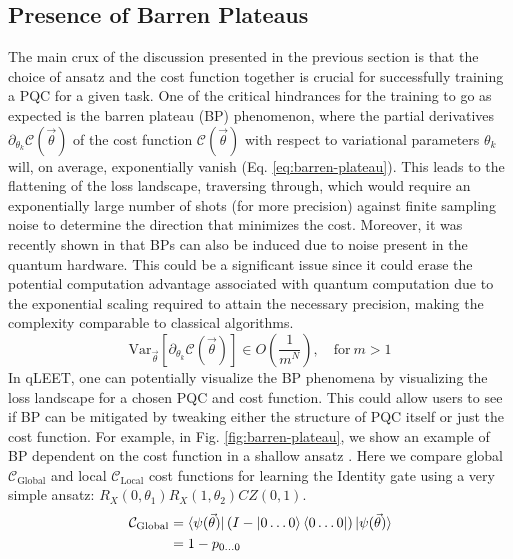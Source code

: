 \documentclass[%
 reprint,
 amsmath,
 amssymb,
 showkeys,
 pra,
 floatfix,
]{revtex4-2}
\begin{document}
\vspace{-2pt}

\subsection{Presence of Barren Plateaus}

The main crux of the discussion presented in the previous section is that the choice of ansatz and the cost function together is crucial for successfully training a PQC for a given task. One of the critical hindrances for the training to go as expected is the barren plateau (BP) phenomenon, where the partial derivatives $\partial_{\theta_k}\mathcal{C}(\vec{\theta})$ of the cost function $\mathcal{C}(\vec{\theta})$ with respect to variational parameters $\theta_k$ will, on average, exponentially vanish (Eq. \ref{eq:barren-plateau}). This leads to the flattening of the loss landscape, traversing through, which would require an exponentially large number of shots (for more precision) against finite sampling noise to determine the direction that minimizes the cost. Moreover, it was recently shown in \cite{2020arXiv200714384W} that BPs can also be induced due to noise present in the quantum hardware. This could be a significant issue since it could erase the potential computation advantage associated with quantum computation due to the exponential scaling required to attain the necessary precision, making the complexity comparable to classical algorithms.
\begin{equation}\label{eq:barren-plateau}
	\text{Var}_{\vec{\theta}}[\partial_{\theta_k}\mathcal{C}(\vec{\theta})] \in O\left(\frac{1}{m^N}\right),\quad \text{for}\ m > 1
\end{equation}
In qLEET, one can potentially visualize the BP phenomena by visualizing the loss landscape for a chosen PQC and cost function. This could allow users to see if BP can be mitigated by tweaking either the structure of PQC itself or just the cost function. For example, in Fig. \ref{fig:barren-plateau}, we show an example of BP dependent on the cost function in a shallow ansatz \cite{s41467-021-21728-w}. Here we compare global $\mathcal{C}_{\text{Global}}$ and local $\mathcal{C}_{\text{Local}}$ cost functions for learning the Identity gate using a very simple ansatz: $R_X(0,\theta_1)R_X(1, \theta_2)CZ(0, 1)$. 
\begin{equation}
\begin{split}
    \mathcal{C}_{\text{Global}} &= \bra{\psi(\vec{\theta})} (I - \ket{0\ldots0}\bra{0\ldots0}) \ket{\psi(\vec{\theta})} \\
    &= 1 - p_{0\ldots0}
\end{split}
\end{equation}
\end{document}
